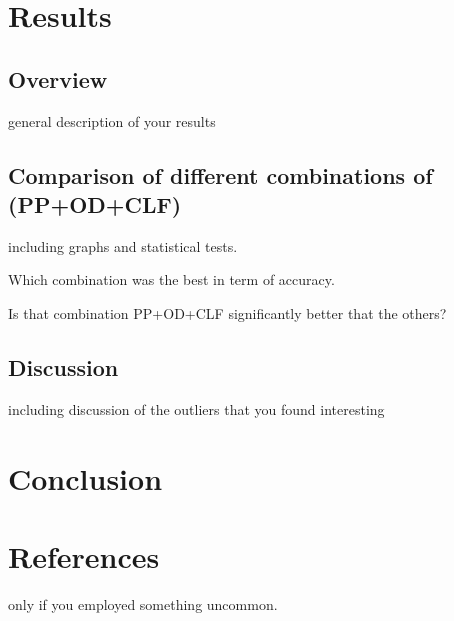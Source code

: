 \documentclass[12pt]{llncs} %
\begin{document}
\section{Results}
\subsection{Overview}
general description of your results

\subsection{Comparison of different combinations of (PP+OD+CLF)}

including graphs and statistical tests.

Which combination was the best in term of accuracy.

Is that combination PP+OD+CLF significantly better that the others?

\subsection{Discussion} 
including discussion of the outliers that you found interesting

\section{Conclusion}

\section{References}
only if you employed something uncommon.
\end{document}
